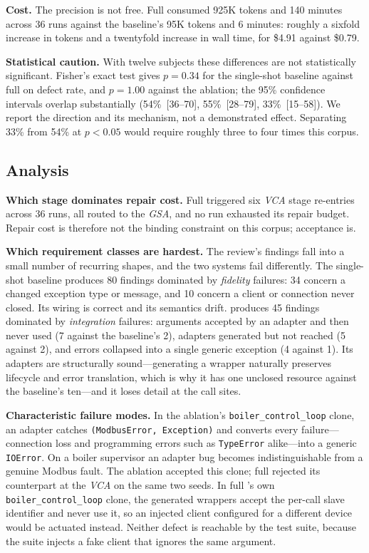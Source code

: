\textbf{Cost.} The precision is not free. Full \sys consumed 925K tokens and 140 minutes across 36 runs against the baseline's 95K tokens and 6 minutes: roughly a sixfold increase in tokens and a twentyfold increase in wall time, for \$4.91 against \$0.79.

\textbf{Statistical caution.} With twelve subjects these differences are not statistically significant. Fisher's exact test gives $p=0.34$ for the single-shot baseline against full \sys on defect rate, and $p=1.00$ against the ablation; the 95\% confidence intervals overlap substantially (54\%~[36--70], 55\%~[28--79], 33\%~[15--58]). We report the direction and its mechanism, not a demonstrated effect. Separating 33\% from 54\% at $p<0.05$ would require roughly three to four times this corpus.

\subsection{Analysis}

\textbf{Which stage dominates repair cost.} Full \sys triggered six \emph{VCA} stage re-entries across 36 runs, all routed to the \emph{GSA}, and no run exhausted its repair budget. Repair cost is therefore not the binding constraint on this corpus; acceptance is.

\textbf{Which requirement classes are hardest.} The review's findings fall into a small number of recurring shapes, and the two systems fail differently. The single-shot baseline produces 80 findings dominated by \emph{fidelity} failures: 34 concern a changed exception type or message, and 10 concern a client or connection never closed. Its wiring is correct and its semantics drift. \sys produces 45 findings dominated by \emph{integration} failures: arguments accepted by an adapter and then never used (7 against the baseline's 2), adapters generated but not reached (5 against 2), and errors collapsed into a single generic exception (4 against 1). Its adapters are structurally sound---generating a wrapper naturally preserves lifecycle and error translation, which is why it has one unclosed resource against the baseline's ten---and it loses detail at the call sites.

\textbf{Characteristic failure modes.} In the ablation's \texttt{boiler\_control\_loop} clone, an adapter catches \texttt{(ModbusError, Exception)} and converts every failure---connection loss and programming errors such as \texttt{TypeError} alike---into a generic \texttt{IOError}. On a boiler supervisor an adapter bug becomes indistinguishable from a genuine Modbus fault. The ablation accepted this clone; full \sys rejected its counterpart at the \emph{VCA} on the same two seeds. In full \sys's own \texttt{boiler\_control\_loop} clone, the generated wrappers accept the per-call slave identifier and never use it, so an injected client configured for a different device would be actuated instead. Neither defect is reachable by the test suite, because the suite injects a fake client that ignores the same argument.

